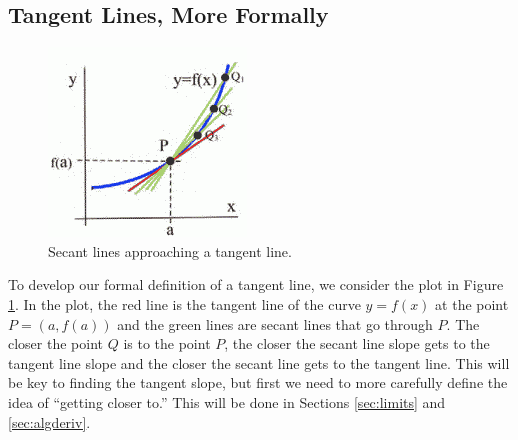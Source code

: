 \subsection{Tangent Lines, More Formally}
\begin{figure}
  \vspace{-20pt}
    \centering
    \includegraphics{img/chap2/image112.png}
    \caption{Secant lines approaching a tangent line.}
\label{fig:2-2-secants}
    \vspace{-10pt}
\end{figure}

To develop our formal definition of a tangent line, we consider the plot in Figure \ref{fig:2-2-secants}. In the plot, the red line is the tangent line of the curve $y=f(x)$ at the point $P = (a, f(a))$ and the green lines are secant lines that go through $P$. The closer the point $Q$ is to the point $P$, the closer the secant line slope gets to the tangent line slope and the closer the secant line gets to the tangent line. This will be key to finding the tangent slope, but first we need to more carefully define the idea of ``getting closer to.'' This will be done in Sections \ref{sec:limits} and \ref{sec:algderiv}.


